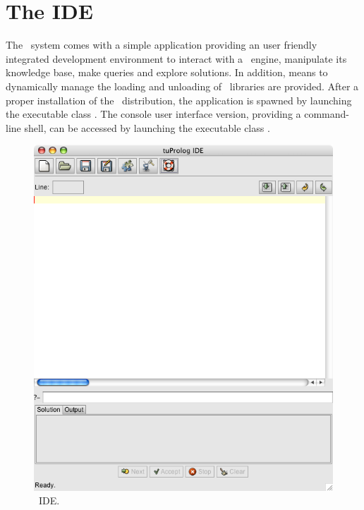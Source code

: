 \chapter{The IDE}

The \tuprolog\ system comes with a simple application providing an user friendly integrated development environment to interact with a \tuprolog\ engine, manipulate its knowledge base, make queries and explore solutions.
%
In addition, means to dynamically manage the loading and unloading of \tuprolog\ libraries are provided.
%
After a proper installation of the \tuprolog\ distribution, the application is spawned by launching the executable class .
%
The console user interface version, providing a command-line shell, can be accessed by launching the executable class .

\begin{figure}
\centering
\includegraphics[scale=0.60]{images/tuPrologIDE}
\caption{\tuprolog\ IDE.}
\label{tuprolog-ide}
\end{figure}

